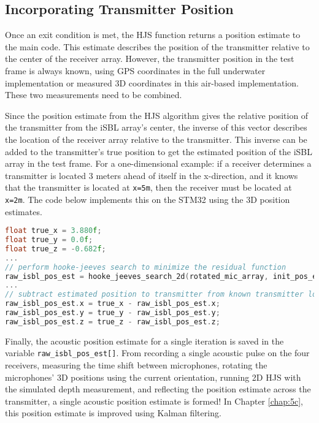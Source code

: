 \documentclass[12pt,a4paper]{report}
\begin{document}
\subsection{Incorporating Transmitter Position} \label{ssec:3s9s3}
Once an exit condition is met, the HJS function returns a position estimate to the main code. This estimate describes the position of the transmitter relative to the center of the receiver array. However, the transmitter position in the test frame is always known, using GPS coordinates in the full underwater implementation or measured 3D coordinates in this air-based implementation. These two measurements need to be combined.

Since the position estimate from the HJS algorithm gives the relative position of the transmitter from the iSBL array’s center, the inverse of this vector describes the location of the receiver array relative to the transmitter. This inverse can be added to the transmitter’s true position to get the estimated position of the iSBL array in the test frame. For a one-dimensional example: if a receiver determines a transmitter is located 3 meters ahead of itself in the x-direction, and it knows that the transmitter is located at \verb|x=5m|, then the receiver must be located at \verb|x=2m|. The code below implements this on the STM32 using the 3D position estimates.

\begin{lstlisting}[language=C++]
float true_x = 3.880f;
float true_y = 0.0f;
float true_z = -0.682f;
...
// perform hooke-jeeves search to minimize the residual function
raw_isbl_pos_est = hooke_jeeves_search_2d(rotated_mic_array, init_pos_est, measured_time_shifts, 1000, 1e-13, 1e-6, 2.0f);
...
// subtract estimated position to transmitter from known transmitter location to get receiver position
raw_isbl_pos_est.x = true_x - raw_isbl_pos_est.x;
raw_isbl_pos_est.y = true_y - raw_isbl_pos_est.y;
raw_isbl_pos_est.z = true_z - raw_isbl_pos_est.z;
\end{lstlisting}

Finally, the acoustic position estimate for a single iteration is saved in the variable \verb|raw_isbl_pos_est[]|. From recording a single acoustic pulse on the four receivers, measuring the time shift between microphones, rotating the microphones’ 3D positions using the current orientation, running 2D HJS with the simulated depth measurement, and reflecting the position estimate across the transmitter, a single acoustic position estimate is formed! In Chapter \ref{chap:5c}, this position estimate is improved using Kalman filtering.



\end{document}
